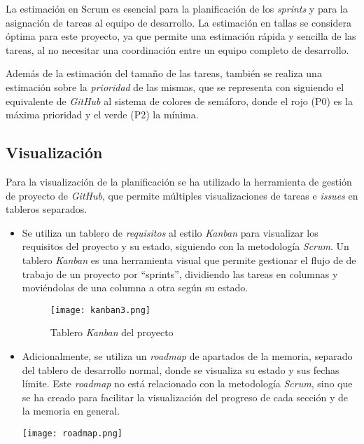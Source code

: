 La estimación en Scrum es esencial para la planificación de los \textit{sprints}
y para la asignación de tareas al equipo de desarrollo. La estimación en tallas
se considera óptima para este proyecto, ya que permite una estimación rápida y
sencilla de las tareas, al no necesitar una coordinación entre un equipo
completo de desarrollo.

Además de la estimación del tamaño de las tareas, también se realiza una
estimación sobre la \textit{prioridad} de las mismas, que se representa con
siguiendo el equivalente de \textit{GitHub} al sistema de colores de semáforo,
donde el rojo (P0) es la máxima prioridad y el verde (P2) la mínima.

\subsection{Visualización}\label{subsec:visual_planif}
Para la visualización de la planificación se ha utilizado la herramienta de
gestión de proyecto de \textit{GitHub}, que permite múltiples visualizaciones de
tareas e \textit{issues} en tableros separados.

\begin{itemize}
	\item Se utiliza un tablero de \textit{requisitos} al estilo \textit{Kanban}
		para visualizar los requisitos del proyecto y su estado, siguiendo con
		la metodología \textit{Scrum}. Un tablero \textit{Kanban} es una
		herramienta visual que permite gestionar el flujo de de trabajo de un
		proyecto por ``sprints'', dividiendo las tareas en columnas y
		moviéndolas de una columna a otra según su estado.

		\begin{figure}[H]
			\centering
			\texttt{[image: kanban3.png]}
			\caption{Tablero \textit{Kanban} del proyecto}
			\label{fig:kanban}
		\end{figure}
	\item Adicionalmente, se utiliza un \textit{roadmap} de apartados de la
		memoria, separado del tablero de desarrollo normal, donde se visualiza
		su estado y sus fechas límite. Este \textit{roadmap} no está relacionado
		con la metodología \textit{Scrum}, sino que se ha creado para facilitar
		la visualización del progreso de cada sección y de la memoria en general.

		\begin{minipage}{\linewidth}
			\centering
			\texttt{[image: roadmap.png]}
		\end{minipage}
\end{itemize}


